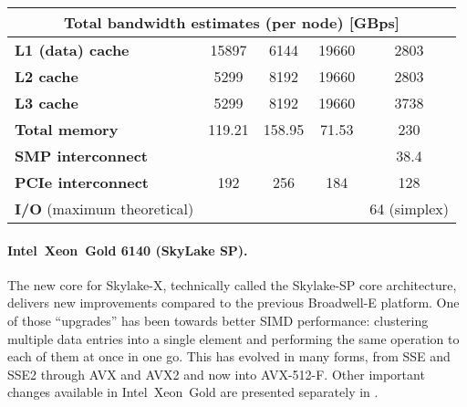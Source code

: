 \begin{table}
\begin{adjustbox}{width=1\textwidth}
\begin{tabular}{l|c|c|c|c|}
\multicolumn{5}{|c|}{Total bandwidth estimates (per node) [GBps]}  \\ \hline
\multicolumn{1}{|l|}{\textbf{L1 (data) cache}} & 15897 & 6144 & 19660 & 2803 \\ \hline
\multicolumn{1}{|l|}{\textbf{L2 cache}} & 5299 & 8192 & 19660 & 2803 \\ \hline
\multicolumn{1}{|l|}{\textbf{L3 cache}} & 5299 & 8192 & 19660 & 3738 \\ \hline
\multicolumn{1}{|l|}{\textbf{Total memory}} & 119.21 & 158.95 & 71.53 & 230 \\ \hline
\multicolumn{1}{|l|}{\textbf{SMP interconnect}} &  &  &  & 38.4 \\ \hline
\multicolumn{1}{|l|}{\textbf{PCIe interconnect}} & 192 & 256 & 184 & 128 \\ \hline
\multicolumn{1}{|l|}{\textbf{I/O} (maximum theoretical)} &  &  &  & 64 (simplex) \\ \hline
\end{tabular}
\end{adjustbox}
\end{table}

\paragraph{Intel\textregistered\ Xeon\textregistered\ Gold 6140 (SkyLake SP).}
The new core for Skylake-X, technically called the Skylake-SP core architecture, delivers new improvements compared to the previous Broadwell-E platform. One of those ``upgrades'' has been towards better SIMD performance: clustering multiple data entries into a single element and performing the same operation to each of them at once in one go. This has evolved in many forms, from SSE and SSE2 through AVX and AVX2 and now into AVX-512-F.
Other important changes available in Intel\textregistered\ Xeon\textregistered\ Gold are presented separately in \cite{INTELXEONGOLD6140}.

